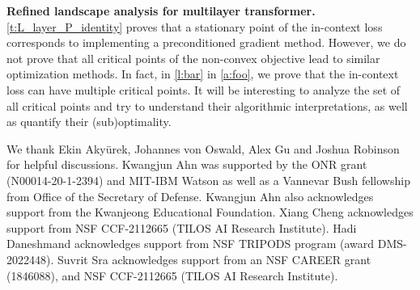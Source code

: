 \documentclass{article}
\newcommand{\emphh}[1]{\textbf{\emph{#1}}}
\begin{document}
 

\textbf{Refined landscape analysis for multilayer transformer.} \autoref{t:L_layer_P_identity}   proves that a stationary point of the in-context loss corresponds to  implementing a preconditioned gradient method. However, we do not prove that all critical points of the non-convex objective lead to similar optimization methods. In fact, in \autoref{l:bar} in   \autoref{a:foo}, we prove that the in-context loss can have multiple critical points. It will be interesting to analyze the set of all critical points and try to understand their algorithmic interpretations, as well as quantify their (sub)optimality.

\begin{ack}
We thank Ekin Akyürek,  Johannes von Oswald, Alex Gu and Joshua Robinson for helpful discussions.
Kwangjun Ahn was supported by the ONR grant (N00014-20-1-2394) and MIT-IBM Watson as
well as a Vannevar Bush fellowship from Office of the Secretary of Defense. Kwangjun Ahn also
acknowledges support from the Kwanjeong Educational Foundation. Xiang Cheng acknowledges
support from NSF CCF-2112665 (TILOS AI Research Institute). Hadi Daneshmand acknowledges support from NSF TRIPODS program (award DMS-2022448). Suvrit Sra acknowledges support
from an NSF CAREER grant (1846088), and NSF CCF-2112665 (TILOS AI Research Institute).

\end{ack}


\appendix
\end{document}
